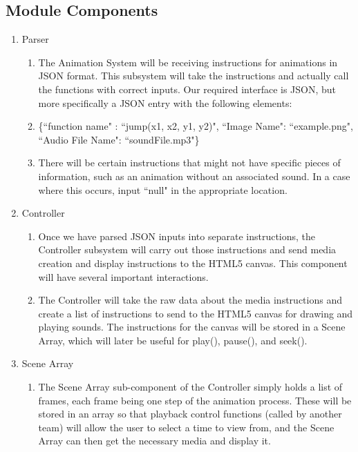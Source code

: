\documentclass[12pt]{article}
\begin{document}
\subsection{Module Components}
\begin{enumerate}
\item Parser
\begin{enumerate}
\item The Animation System will be receiving instructions for animations in JSON format. This subsystem will take the instructions and actually call the functions with correct inputs. Our required interface is JSON, but more specifically a JSON entry with the following elements:
\item \{``function name" : ``jump(x1, x2, y1, y2)", ``Image Name": ``example.png", ``Audio File Name": ``soundFile.mp3"\}
\item There will be certain instructions that might not have specific pieces of information, such as an animation without an associated sound. In a case where this occurs, input ``null" in the appropriate location.

\end{enumerate}

\item Controller
\begin{enumerate}
\item Once we have parsed JSON inputs into separate instructions, the Controller subsystem will carry out those instructions and send media creation and display instructions to the HTML5 canvas. This component will have several important interactions.
\item The Controller will take the raw data about the media instructions and create a list of instructions to send to the HTML5 canvas for drawing and playing sounds. The instructions for the canvas will be stored in a Scene Array, which will later be useful for play(), pause(), and seek().
\end{enumerate}

\item Scene Array
\begin{enumerate}
\item The Scene Array sub-component of the Controller simply holds a list of frames, each frame being one step of the animation process. These will be stored in an array so that playback control functions (called by another team) will allow the user to select a time to view from, and the Scene Array can then get the necessary media and display it. 
\end{enumerate}
\end{enumerate}
\end{document}
